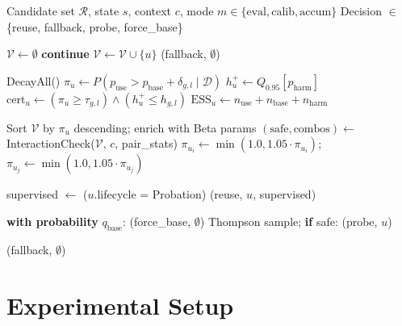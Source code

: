 \documentclass[letterpaper]{article}
\begin{document}
\begin{algorithm}[t]
\caption{\textsc{C-ACT} Admission Decision at Runtime}
\label{alg:cact}
\begin{algorithmic}[1]
\REQUIRE Candidate set $\mathcal{R}$, state $s$, context $c$, mode $m \in \{\text{eval}, \text{calib}, \text{accum}\}$
\ENSURE Decision $\in$ \{reuse, fallback, probe, force\_base\}

\STATE $\mathcal{V} \gets \emptyset$
        \STATE \textbf{continue} 
    \ENDIF
    \STATE $\mathcal{V} \gets \mathcal{V} \cup \{u\}$
\ENDFOR
{} \RETURN (fallback, $\emptyset$) \ENDIF

\STATE DecayAll() 
    \STATE $\pi_u \gets P(p_{\text{use}} > p_{\text{base}} + \delta_{g,l} \mid \mathcal{D})$
    \STATE $h_u^+ \gets Q_{0.95}[p_{\text{harm}}]$
    \STATE $\text{cert}_u \gets (\pi_u \ge \tau_{g,l}) \land (h_u^+ \le h_{g,l})$
    \STATE $\text{ESS}_u \gets n_{\text{use}} + n_{\text{base}} + n_{\text{harm}}$
\ENDFOR

\STATE Sort $\mathcal{V}$ by $\pi_u$ descending; enrich with Beta params
\STATE $(\text{safe}, \text{combos}) \gets$ InteractionCheck($\mathcal{V}$, $c$, pair\_stats)
    \STATE $\pi_{u_i} \gets \min(1.0, 1.05 \cdot \pi_{u_i})$; $\pi_{u_j} \gets \min(1.0, 1.05 \cdot \pi_{u_j})$
\ENDFOR

        \STATE supervised $\gets$ ($u$.lifecycle = Probation)
        \STATE \RETURN (reuse, $u$, supervised)
    \ENDIF
\ENDFOR

    \STATE \textbf{with probability} $q_{\text{base}}$: \RETURN (force\_base, $\emptyset$)
        \STATE Thompson sample; \textbf{if} safe: \RETURN (probe, $u$)
    \ENDIF
\ENDIF

\RETURN (fallback, $\emptyset$)
\end{algorithmic}
\end{algorithm}

\section{Experimental Setup}
\end{document}
